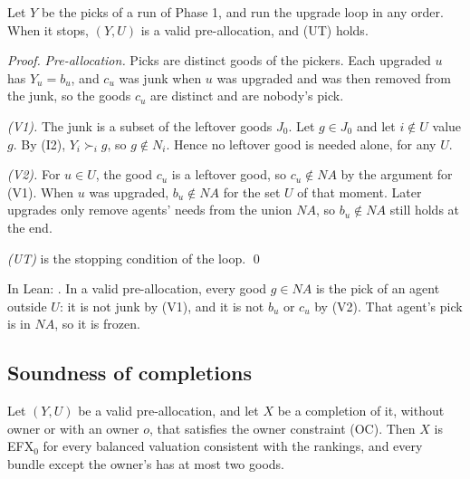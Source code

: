 \documentclass[runningheads,11pt]{llncs}
\newcommand{\efxz}{\texorpdfstring{\mbox{EFX$_0$}}{EFX0}}
\newcommand{\NA}{\mathit{NA}}
\begin{document}
\begin{lemma}[upgrades]\label{lem:upgrades}
Let $Y$ be the picks of a run of Phase 1, and run the upgrade loop in any order. When it stops, $(Y,U)$ is a valid pre-allocation, and (UT) holds.
\end{lemma}

\begin{proof}
\emph{Pre-allocation.} Picks are distinct goods of the pickers. Each upgraded $u$ has $Y_u=b_u$, and $c_u$ was junk when $u$ was upgraded and was then removed from the junk, so the goods $c_u$ are distinct and are nobody's pick.

\emph{(V1).} The junk is a subset of the leftover goods $J_0$. Let $g\in J_0$ and let $i\notin U$ value $g$. By (I2), $Y_i\succ_i g$, so $g\notin N_i$. Hence no leftover good is needed alone, for any $U$.

\emph{(V2).} For $u\in U$, the good $c_u$ is a leftover good, so $c_u\notin\NA$ by the argument for (V1). When $u$ was upgraded, $b_u\notin\NA$ for the set $U$ of that moment. Later upgrades only remove agents' needs from the union $\NA$, so $b_u\notin\NA$ still holds at the end.

\emph{(UT)} is the stopping condition of the loop. \qed
\end{proof}

\noindent In Lean: . In a valid pre-allocation, every good $g\in\NA$ is the pick of an agent outside $U$: it is not junk by (V1), and it is not $b_u$ or $c_u$ by (V2). That agent's pick is in $\NA$, so it is frozen.

\subsection{Soundness of completions}\label{sec:sound}

\begin{theorem}[soundness]\label{thm:sound}
Let $(Y,U)$ be a valid pre-allocation, and let $X$ be a completion of it, without owner or with an owner $o$, that satisfies the owner constraint (OC). Then $X$ is \efxz{} for every balanced valuation consistent with the rankings, and every bundle except the owner's has at most two goods.
\end{theorem}
\end{document}
